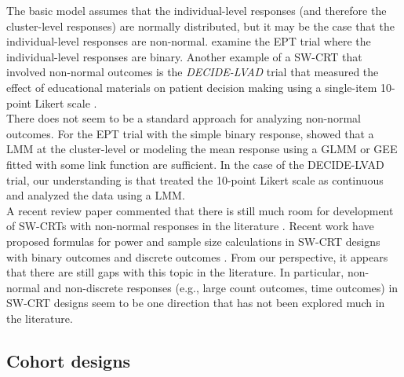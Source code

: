 \documentclass[10pt]{article}
\begin{document}
The basic model assumes that the individual-level responses (and therefore the cluster-level responses) are normally distributed, but it may be the case that the individual-level responses are non-normal. \citeauthor{Hussey:2007} examine the EPT trial where the individual-level responses are binary. Another example of a SW-CRT that involved non-normal outcomes is the \textit{DECIDE-LVAD} trial that measured the effect of educational materials on patient decision making using a single-item 10-point Likert scale \parencite{Allen:2018}.
\\

There does not seem to be a standard approach for analyzing non-normal outcomes. For the EPT trial with the simple binary response, \citeauthor{Hussey:2007} showed that a LMM at the cluster-level or modeling the mean response using a GLMM or GEE fitted with some link function are sufficient. In the case of the DECIDE-LVAD trial, our understanding is that \citeauthor{Allen:2018} treated the 10-point Likert scale as continuous and analyzed the data using a LMM.
\\

A recent review paper commented that there is still much room for development of SW-CRTs with non-normal responses in the literature \parencite{Li:2021}. Recent work have proposed formulas for power and sample size calculations in SW-CRT designs with binary outcomes \parencite{Wang:2021} and discrete outcomes \parencite{Xia:2021}. From our perspective, it appears that there are still gaps with this topic in the literature. In particular, non-normal and non-discrete responses (e.g., large count outcomes, time outcomes) in SW-CRT designs seem to be one direction that has not been explored much in the literature.

\subsection{Cohort designs}
\end{document}
